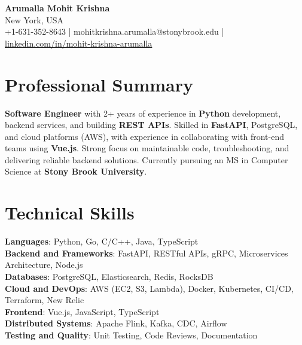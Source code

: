 \documentclass[letterpaper,11pt]{article}
\begin{document}
\begin{center}
  {\Large \textbf{Arumalla Mohit Krishna}} \\
  New York, USA \\
  +1-631-352-8643 \enspace | \enspace mohitkrishna.arumalla@stonybrook.edu \enspace | \enspace \href{https://www.linkedin.com/in/mohit-krishna-arumalla}{linkedin.com/in/mohit-krishna-arumalla}
\end{center}

\section{Professional Summary}
  \begin{itemize}[leftmargin=0.15in, label={}]
    \small{\item{
     \textbf{Software Engineer} with 2+ years of experience in \textbf{Python} development, backend services, and building \textbf{REST APIs}. Skilled in \textbf{FastAPI}, PostgreSQL, and cloud platforms (AWS), with experience in collaborating with front-end teams using \textbf{Vue.js}. Strong focus on maintainable code, troubleshooting, and delivering reliable backend solutions. Currently pursuing an MS in Computer Science at \textbf{Stony Brook University}.
    }}
  \end{itemize}
\vspace{-16pt}

\section{Technical Skills}
 \begin{itemize}[leftmargin=0.15in, label={}]
    \small{\item{
     \textbf{Languages}: Python, Go, C/C++, Java, TypeScript \\
     \textbf{Backend and Frameworks}: FastAPI, RESTful APIs, gRPC, Microservices Architecture, Node.js \\
     \textbf{Databases}: PostgreSQL, Elasticsearch, Redis, RocksDB \\
     \textbf{Cloud and DevOps}: AWS (EC2, S3, Lambda), Docker, Kubernetes, CI/CD, Terraform, New Relic \\
     \textbf{Frontend}: Vue.js, JavaScript, TypeScript \\
     \textbf{Distributed Systems}: Apache Flink, Kafka, CDC, Airflow \\
     \textbf{Testing and Quality}: Unit Testing, Code Reviews, Documentation
    }}
 \end{itemize}
\vspace{-16pt}
\end{document}
